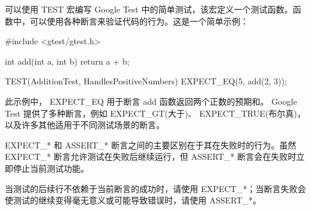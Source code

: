 可以使用 TEST 宏编写 Google Test 中的简单测试，该宏定义一个测试函数。函数中，可以使用各种断言来验证代码的行为。这是一个简单示例：

\begin{shell}
#include <gtest/gtest.h>

int add(int a, int b) {
    return a + b;
}

TEST(AdditionTest, HandlesPositiveNumbers) {
    EXPECT_EQ(5, add(2, 3));
}
\end{shell}

此示例中， EXPECT\_EQ 用于断言 add 函数返回两个正数的预期和。 Google Test 提供了多种断言，例如 EXPECT\_GT(大于)、 EXPECT\_TRUE(布尔真)，以及许多其他适用于不同测试场景的断言。

EXPECT\_* 和 ASSERT\_* 断言之间的主要区别在于其在失败时的行为。虽然 EXPECT\_* 断言允许测试在失败后继续运行，但 ASSERT\_* 断言会在失败时立即停止当前测试功能。

当测试的后续行不依赖于当前断言的成功时，请使用 EXPECT\_*；当断言失败会使测试的继续变得毫无意义或可能导致错误时，请使用 ASSERT\_*。
